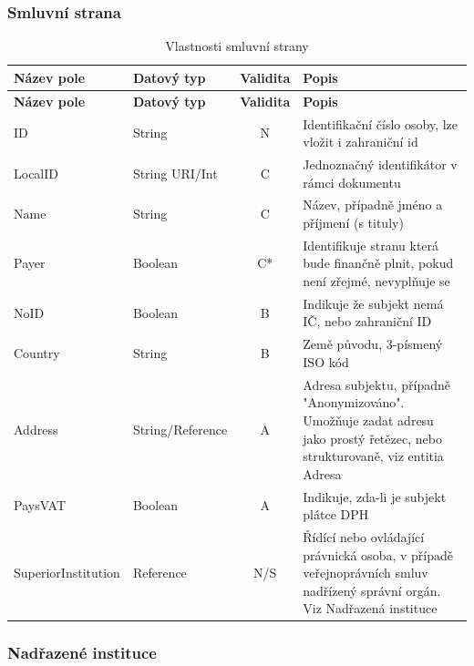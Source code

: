 \newpage

\subsubsection*{Smluvní strana}

\begin{center}
\begin{longtable}{lp{20mm}cp{65mm}}
\label{grid_mlmmh} \\
\multicolumn{1}{l}{\textbf{Název pole}} & 
\multicolumn{1}{l}{\textbf{Datový typ}} & 
\multicolumn{1}{l}{\textbf{Validita}} & 
\multicolumn{1}{l}{\textbf{Popis}} \\ \hline 
\endfirsthead
\multicolumn{1}{l}{\textbf{Název pole}} & 
\multicolumn{1}{l}{\textbf{Datový typ}} & 
\multicolumn{1}{l}{\textbf{Validita}} & 
\multicolumn{1}{l}{\textbf{Popis}} \\ \hline 
\hline
\endhead
\endfoot
\caption{Vlastnosti smluvní strany}
\endlastfoot
ID & String & N & Identifikační číslo osoby, lze vložit i zahraniční id \\
\rowcolor{validateC}LocalID & String URI/Int & C & Jednoznačný identifikátor v rámci dokumentu \\
\rowcolor{validateC}Name & String & C & Název, případně jméno a příjmení (s tituly) \\
\rowcolor{validateC}Payer & Boolean & C* & Identifikuje stranu která bude finančně plnit, pokud není zřejmé, nevyplňuje se \\
\rowcolor{validateB}NoID & Boolean & B & Indikuje že subjekt nemá IČ, nebo zahraniční ID \\
\rowcolor{validateB}Country & String & B & Země původu, 3-písmený ISO kód \\
\rowcolor{validateA}Address & String/Reference & A & Adresa subjektu, případně "Anonymizováno". Umožňuje zadat adresu jako prostý řetězec, nebo strukturovaně, viz entitia Adresa \\
\rowcolor{validateA}PaysVAT & Boolean & A & Indikuje, zda-li je subjekt plátce DPH \\
\rowcolor{validateS}SuperiorInstitution & Reference & N/S & Řídící nebo ovládající právnická osoba, v případě  veřejnoprávních smluv nadřízený správní orgán. Viz Nadřazená instituce \\
\end{longtable}
\end{center}

\subsubsection*{Nadřazené instituce}

